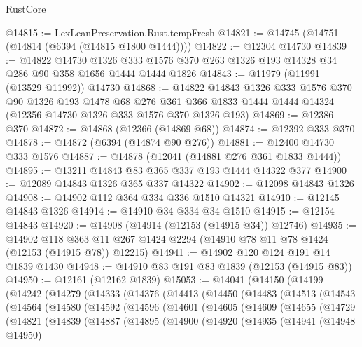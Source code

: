 \begin{lexlean}{RustCore}
\begin{coremodule}
@14815 := LexLeanPreservation.Rust.tempFresh
@14821 := @14745 (@14751 (@14814 (@6394 (@14815 @1800 @1444))))
@14822 := @12304 @14730
@14839 := @14822
    @14730
    @1326
    @333
    @1576
    @370
    @263
    @1326
    @193
    @14328
    @34
    @286
    @90
    @358
    @1656
    @1444
    @1444
    @1826
@14843 := @11979 (@11991 (@13529 @11992)) @14730
@14868 := @14822
    @14843
    @1326
    @333
    @1576
    @370
    @90
    @1326
    @193
    @1478
    @68
    @276
    @361
    @366
    @1833
    @1444
    @1444
    @14324
    (@12356 @14730 @1326 @333 @1576 @370 @1326 @193)
@14869 := @12386 @370
@14872 := @14868 (@12366 (@14869 @68))
@14874 := @12392 @333 @370
@14878 := @14872 (@6394 (@14874 @90 @276))
@14881 := @12400 @14730 @333 @1576
@14887 := @14878 (@12041 (@14881 @276 @361 @1833 @1444))
@14895 := @13211 @14843 @83 @365 @337 @193 @1444 @14322 @377
@14900 := @12089 @14843 @1326 @365 @337 @14322
@14902 := @12098 @14843 @1326
@14908 := @14902 @112 @364 @334 @336 @1510 @14321
@14910 := @12145 @14843 @1326
@14914 := @14910 @34 @334 @34 @1510
@14915 := @12154 @14843
@14920 := @14908 (@14914 (@12153 (@14915 @34)) @12746)
@14935 := @14902
    @118
    @363
    @11
    @267
    @1424
    @2294
    (@14910 @78 @11 @78 @1424 (@12153 (@14915 @78)) @12215)
@14941 := @14902 @120 @124 @191 @14 @1839 @1430
@14948 := @14910 @83 @191 @83 @1839 (@12153 (@14915 @83))
@14950 := @12161 (@12162 @1839)
@15053 := @14041
    (@14150
      (@14199
        (@14242
          (@14279
            (@14333
              (@14376
                (@14413
                  (@14450
                    (@14483
                      (@14513
                        (@14543
                          (@14564
                            (@14580
                              (@14592
                                (@14596
                                  (@14601
                                    (@14605
                                      (@14609
                                        (@14655
                                          (@14729
                                            (@14821
                                              (@14839
                                                (@14887
                                                  (@14895
                                                    (@14900
                                                      (@14920
                                                        (@14935
                                                          (@14941
                                                            (@14948 @14950)

\end{coremodule}
\end{lexlean}
